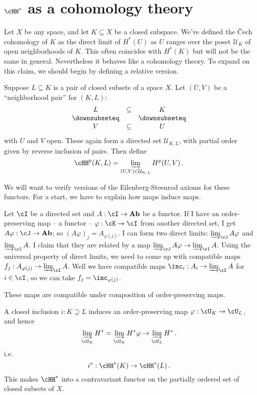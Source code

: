 \section{$\cHH^\ast$ as a cohomology theory}


Let $X$ be any space, and let $K\subseteq X$ be a closed subspace.
We've defined the \v{C}ech cohomology of $K$ as the direct limit of 
$H^*(U)$ as $U$ ranges over the poset $\mathcal{U}_K$ of open neighborhoods
of $K$. This often coincides with $H^*(K)$ but will not be the same in
general. Nevertheless it behaves like a cohomology theory. To expand on
this claim, we should begin by defining a relative version. 

Suppose $L\subseteq K$ is a pair of  closed subsets of a space $X$.  Let 
$(U,V)$ be a ``neighborhood pair'' for $(K,L)$: 
\[
\begin{array}{ccc} L & \subseteq & K \\
\downsubseteq & & \downsubseteq \\
V & \subseteq & U
\end{array}
\]
with $U$ and $V$ open. These again form a directed set $\mathcal{U}_{K,L}$,
with partial order given by reverse inclusion of pairs. Then define
\[
\cHH^p(K,L)=\varinjlim_{(U,V)\in\mathcal{U}_{K,L}} H^p(U,V)\,.
\]

We will want to verify versions of the Eilenberg-Steenrod axioms for these
functors. For a start, we have to explain how maps induce maps. 

Let $\cI$ be a directed set and $A:\cI\to \mathbf{Ab}$ be a functor. 
If I have an order-preserving map -- a functor -- $\varphi:\cK\to\cI$ 
from another directed set, I get 
$A\varphi:\cJ\to\mathbf{Ab}$; so $(A\varphi)_j=A_{\varphi(j)}$.
I can form two direct limits: $\varinjlim_{\cJ}A\varphi$ and $\varinjlim_{\cI}A$. I claim that they are related by a map $\varinjlim_{\cJ}A\varphi\to\varinjlim_{\cI}A$. 
Using the universal property of direct limits, we need to come up with compatible maps $f_j:A_{\varphi(j)}\to\varinjlim_{\cI}A$. Well we have compatible maps 
$\inc_i:A_i\to\varinjlim_{\cI}A$ for $i\in\cI$, so we can take 
$f_j=\inc_{\varphi(j)}$. 

These maps are compatible under composition of order-preserving maps. 

\begin{example}
A closed inclusion $i:K\supseteq L$ induces an order-preserving map
$\varphi:\cU_K\to\cU_L$, and hence 
\[
\varinjlim_{\cU_K}H^*=\varinjlim_{\cU_K}H^*\varphi\to\varinjlim_{\cU_L}H^*\,.
\]
i.e.
\[
i^*:\cHH^\ast(K)\to\cHH^\ast(L)\,.
\]
This makes $\cHH^*$ into a contravariant functor on the partially ordered 
set of closed subsets of $X$. 
\end{example}

